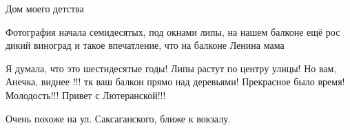  
 
 
 
 

Дом моего детства


Фотография начала семидесятых, под окнами липы, на нашем балконе ещё рос дикий
виноград и такое впечатление, что на балконе Ленина мама



Я думала, что это шестидесятые годы! Липы растут по центру улицы! Но вам,
Анечка, виднее !!! тк ваш балкон прямо над деревьями! Прекрасное было время!
Молодость!!! Привет с Лютеранской!!!



Очень похоже на ул. Саксаганского, ближе к вокзалу.
